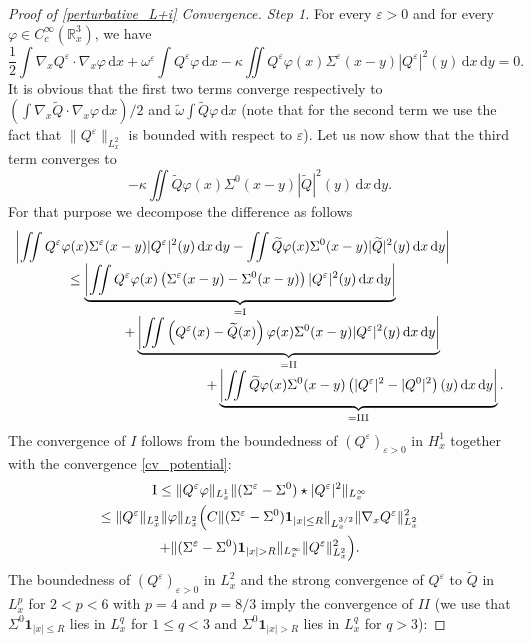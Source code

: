 \documentclass[JEP,XML,SOM,NoEqCountersInSection,NoFloatCountersInSection,Unicode,published]{cedram}
\theoremstyle{definition}
\newenvironment{ProofOf}[1]{\begin{proof}[Proof of #1]}{\end{proof}}
\newcommand{\R}{\mathbb{R}}
\let\ds\displaystyle
\newcommand{\ud}{\, {\mathrm{d}}}
\begin{document}
\begin{ProofOf}{\eqref{perturbative_L+i} Convergence. Step 1}
For every $\varepsilon>0$ and for every $\varphi\in C_{c}^{\infty}(\R_{x}^{3})$, we have
\[
\frac{1}{2}\int\nabla_{x}Q^{\varepsilon}\cdot\nabla_{x}\varphi\ud x+\omega^{\varepsilon}\int Q^{\varepsilon}\varphi\ud x-\kappa\iint Q^{\varepsilon}\varphi(x)\Sigma^{\varepsilon}(x-y)|Q^{\varepsilon}|^{2}(y)\ud x\ud y=0.
\]
It is obvious that the first two terms converge respectively to $(\int\nabla_{x}\widetilde{Q}\cdot\nabla_{x}\varphi\ud x)/2$ and $\widetilde{\omega}\int\widetilde{Q}\varphi\ud x$ (note that for the second term we use the fact that $\|Q^{\varepsilon}\|_{L_{x}^{2}}$ is bounded with respect to $\varepsilon$). Let us now show that the third term converges to
\[
-\kappa\iint\widetilde{Q}\varphi(x)\Sigma^{0}(x-y)|\widetilde{Q}|^{2}(y)\ud x\ud y.
\]
For that purpose we decompose the difference as follows
\[
\begin{array}{l}
\ds \left|\iint Q^{\varepsilon}\varphi(x)\Sigma^{\varepsilon}(x-y)|Q^{\varepsilon}|^{2}(y)\ud x\ud y-\iint\widetilde{Q}\varphi(x)\Sigma^{0}(x-y)|\widetilde{Q}|^{2}(y)\ud x\ud y\right|\\
\ds\qquad\qquad \leq\underbrace{\left|\iint Q^{\varepsilon}\varphi(x)\left(\Sigma^{\varepsilon}(x-y)-\Sigma^{0}(x-y)\right)|Q^{\varepsilon}|^{2}(y)\ud x\ud y\right|}_{=\textup{I}}\\
\ds\qquad\qquad\qquad \qquad+\underbrace{\left|\iint \left(Q^{\varepsilon}(x)-\widetilde{Q}(x)\right)\varphi(x)\Sigma^{0}(x-y)|Q^{\varepsilon}|^{2}(y)\ud x\ud y\right|}_{=\textup{II}}\\
\ds\qquad\qquad\qquad \qquad\qquad\qquad \qquad +\underbrace{\biggl|\iint \widetilde{Q}\varphi(x)\Sigma^{0}(x-y)\left(|Q^{\varepsilon}|^{2}-|Q^{0}|^{2}\right)(y)\ud x\ud y\biggr|}_{=\textup{III}}.
\end{array}
\]
The convergence of $I$ follows from the boundedness of $(Q^{\varepsilon})_{\varepsilon>0}$ in $H_{x}^{1}$ together with the convergence \eqref{cv_potential}:
\begin{multline*}
\textup{I}\leq\|Q^{\varepsilon}\varphi\|_{L_{x}^{1}}\|(\Sigma^{\varepsilon}-\Sigma^{0})\star|Q^{\varepsilon}|^{2}\|_{L_{x}^{\infty}}\\
\leq\|Q^{\varepsilon}\|_{L_{x}^{2}}\|\varphi\|_{L_{x}^{2}}\Bigl(C\|(\Sigma^{\varepsilon}-\Sigma^{0})\mathbf{1}_{|x|\leq R}\|_{L_{x}^{3/2}}\|\nabla_{x}Q^{\varepsilon}\|_{L_{x}^{2}}^{2}
\\+\|(\Sigma^{\varepsilon}-\Sigma^{0})\mathbf{1}_{|x|>R}\|_{L_{x}^{\infty}}\|Q^{\varepsilon}\|_{L_{x}^{2}}^{2}\Bigr).
\end{multline*}
The boundedness of $(Q^{\varepsilon})_{\varepsilon>0}$ in $L_{x}^{2}$ and the strong convergence of $Q^{\varepsilon}$ to $\widetilde{Q}$ in $L_{x}^{p}$ for $2<p<6$ with $p=4$ and $p=8/3$ imply the convergence of $II$ (we use that $\Sigma^{0}\mathbf{1}_{|x|\leq R}$ lies in $L_{x}^{q}$ for $1\leq q<3$ and $\Sigma^{0}\mathbf{1}_{|x|>R}$ lies in $L_{x}^{q}$ for $q>3$):

\end{ProofOf}
\end{document}
